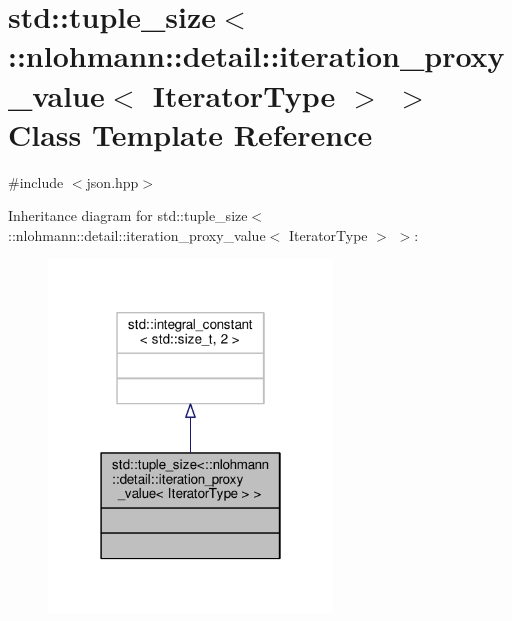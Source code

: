 \hypertarget{classstd_1_1tuple__size_3_1_1nlohmann_1_1detail_1_1iteration__proxy__value_3_01IteratorType_01_4_01_4}{}\section{std\+:\+:tuple\+\_\+size$<$\+:\+:nlohmann\+:\+:detail\+:\+:iteration\+\_\+proxy\+\_\+value$<$ Iterator\+Type $>$ $>$ Class Template Reference}
\label{classstd_1_1tuple__size_3_1_1nlohmann_1_1detail_1_1iteration__proxy__value_3_01IteratorType_01_4_01_4}


{\ttfamily \#include $<$json.\+hpp$>$}



Inheritance diagram for std\+:\+:tuple\+\_\+size$<$\+:\+:nlohmann\+:\+:detail\+:\+:iteration\+\_\+proxy\+\_\+value$<$ Iterator\+Type $>$ $>$\+:
\nopagebreak
\begin{figure}[H]
\begin{center}
\leavevmode
\includegraphics[width=214pt]{classstd_1_1tuple__size_3_1_1nlohmann_1_1detail_1_1iteration__proxy__value_3_01IteratorType_01_4_01_4__inherit__graph}
\end{center}
\end{figure}


